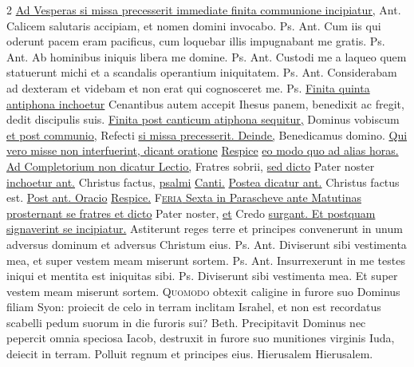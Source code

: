 \begin{multicols*}{2}
\newline \ul{Ad Vesperas si missa precesserit immediate finita communione incipiatur,} {\color{Red} Ant.} Calicem salutaris accipiam, et nomen domini invocabo. {\color{Red} Ps.}  {\color{Red} Ant.} Cum iis qui oderunt pacem eram pacificus, cum loquebar illis impugnabant me gratis. {\color{Red} Ps.}  {\color{Red} Ant.} Ab hominibus iniquis libera me domine. {\color{Red} Ps.}  {\color{Red} Ant.} Custodi me a laqueo quem statuerunt michi et a scandalis operantium iniquitatem. {\color{Red} Ps.}  {\color{Red} Ant.} Considerabam ad dexteram et videbam et non erat qui cognosceret me. {\color{Red} Ps.}  \ul{Finita quinta antiphona inchoetur}
 Cenantibus autem accepit Ihesus panem, benedixit ac fregit, dedit discipulis suis.
\newline \ul{Finita post canticum atiphona sequitur,} Dominus vobiscum \ul{et post communio,} Refecti \ul{si missa precesserit. Deinde,} Benedicamus domino. \ul{Qui vero misse non interfuerint, dicant oratione} \hyperlink{respice-oratio}{Respice} \ul{eo modo quo ad alias horas.}
\newline \ul{Ad Completorium non dicatur Lectio,} Fratres sobrii, \ul{sed dicto} Pater noster \ul{inchoetur ant.} Christus factus, \ul{psalmi}     \ul{Canti.}  \ul{Postea dicatur ant.} Christus factus est. \ul{Post ant. Oracio} \hyperlink{respice-oratio}{Respice.}
{\color{Red} }
\lettrine[lines=2]{\zallmancaps \color{Blue} F}{}\ul{\textsc{eria} Sexta in Parascheve ante Matutinas prosternant se fratres et dicto} Pater noster, \ul{et} Credo \ul{surgant. Et postquam signaverint se incipiatur.}
 Astiterunt reges terre et principes convenerunt in unum adversus dominum et adversus Christum eius. {\color{Red} Ps.}  {\color{Red} Ant.} Diviserunt sibi vestimenta mea, et super vestem meam miserunt sortem. {\color{Red} Ps.}  {\color{Red} Ant.} Insurrexerunt in me testes iniqui et mentita est iniquitas sibi. {\color{Red} Ps.}  \V Diviserunt sibi vestimenta mea. \R Et super vestem meam miserunt sortem.
\lettrine[lines=2]{\zallmancaps \color{Red} Q}{uomodo} obtexit caligine in furore suo Dominus filiam Syon: proiecit de celo in terram inclitam Israhel, et non est recordatus scabelli pedum suorum in die furoris sui? {\color{Red} Beth.} Precipitavit Dominus nec pepercit omnia speciosa Iacob, destruxit in furore suo munitiones virginis Iuda, deiecit in terram. Polluit regnum et principes eius. Hierusalem Hierusalem. \R

\end{multicols*}

